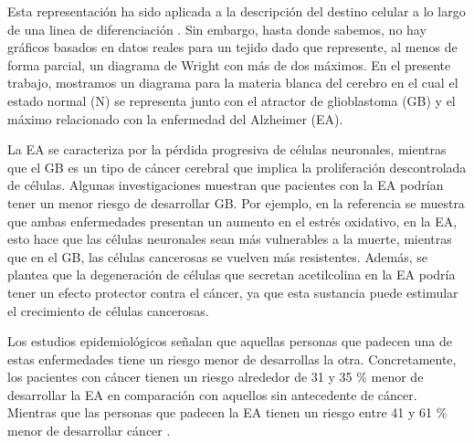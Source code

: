 Esta representación ha sido aplicada a la descripción del destino celular a lo largo de una linea de diferenciación \cite{casey2020theory}. Sin embargo, hasta donde sabemos, no hay gráficos basados en datos reales para un tejido dado que represente, al menos de forma parcial, un diagrama de Wright con más de dos máximos. En el presente trabajo, mostramos un diagrama para la materia blanca del cerebro en el cual el estado normal (N) se representa junto con el atractor de glioblastoma (GB) y el máximo relacionado con la enfermedad del Alzheimer (EA).

La EA se caracteriza por la pérdida progresiva de células neuronales, mientras que el GB es un tipo de cáncer cerebral que implica la proliferación descontrolada de células. Algunas investigaciones muestran que pacientes con la EA podrían tener un menor riesgo de desarrollar GB. Por ejemplo, en la referencia \cite{ou2012does} se muestra que ambas enfermedades presentan un aumento en el estrés oxidativo, en la EA, esto hace que las células neuronales sean más vulnerables a la muerte, mientras que en el GB, las células cancerosas se vuelven más resistentes. Además, se plantea que la degeneración de células que secretan acetilcolina en la EA podría tener un efecto protector contra el cáncer, ya que esta sustancia puede estimular el crecimiento de células cancerosas.


Los estudios epidemiológicos señalan que aquellas personas que padecen una de estas enfermedades tiene un riesgo menor de desarrollas la otra. Concretamente, los pacientes con cáncer tienen un riesgo alrededor de 31 y 35 \% menor de desarrollar la EA en comparación con aquellos sin antecedente de cáncer. Mientras que las personas que padecen la EA tienen un riesgo entre 41 y 61 \% menor de desarrollar cáncer \cite{Roe_2010, Driver_2012, Musicco_2013}.

